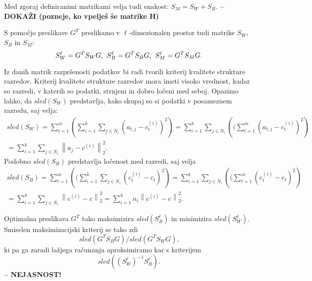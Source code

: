\documentclass[mat1]{article}
\newcommand{\norm}[1]{\left\lVert#1\right\rVert}
\begin{document}
Med zgoraj definiranimi matrikami velja tudi enakost:
$S_M = S_W + S_B \text{.}$ \textbf{-- DOKAŽI (pozneje, ko vpelješ še matrike H)}

S pomočjo preslikave $G^T$ preslikamo v $\ell$-dimezionalen prostor tudi matrike $S_W$, $S_B$ in $S_M$:
$$ S_{W}^{\ell} = G^T S_W G \text{,} \hspace{2mm} S_{B}^{\ell} = G^T S_B G \text{,} \hspace{2mm} S_{M}^{\ell} = G^T S_M G \text{.}
$$

Iz danih matrik razpršenosti podatkov bi radi tvorili kriterij kvalitete strukture razredov. Kriterij kvalitete strukture razredov mora imeti visoko vrednost, kadar so razredi, v katerih so podatki, strnjeni in dobro ločeni med seboj. Opazimo lahko, da $sled(S_W)$ predstavlja, kako skupaj so si podatki v posameznem razredu, saj velja:
\begin{gather*} 
sled(S_W) = \sum_{t=1}^{m} \left( \sum_{i = 1}^{k} \sum_{j \in N_i}(a_{t, j} - c_t^{(i)})^2 \right)
= \sum_{i = 1}^{k} \sum_{j \in N_i} \left(( \sum_{t=1}^{m} (a_{t, j} - c_t^{(i)})^2 \right) \\
= \sum_{i = 1}^{k} \sum_{j \in N_i} \norm{ a_j - c^{(i)}}_2^2 \text{.}
\end{gather*}
Podobno $sled(S_B)$ predstavlja ločenost med razredi, saj velja
\begin{gather*} 
sled(S_B) = \sum_{t=1}^{m} \left((\sum_{i = 1}^{k} \sum_{j \in N_i}(c_t^{(i)} - c_t)^2\right)
= \sum_{i = 1}^{k} \sum_{j \in N_i} \left(( \sum_{t=1}^{m} (c_t^{(i)} - c_t)^2 \right) \\
= \sum_{i = 1}^{k} \sum_{j \in N_i} \norm{ c^{(i)} - c}_2^2 
= \sum_{i = 1}^{k} n_i \norm{ c^{(i)} - c}_2^2
\text{.}
\end{gather*}

Optimalna preslikava $G^T$ tako maksimizira $sled(S_{B}^{\ell})$ in minimizira $sled(S_{W}^{\ell})$. Smiselen maksimizacijski kriterij se tako zdi $$sled( G^T S_B G) / sled( G^T S_W G) \text{,}$$ ki pa ga zaradi lažjega računanja aproksimiramo kar s kriterijem $$sled((S_W^\ell)^{-1}S_B^\ell) \text{.}$$
\textbf{-- NEJASNOST!}
\end{document}
